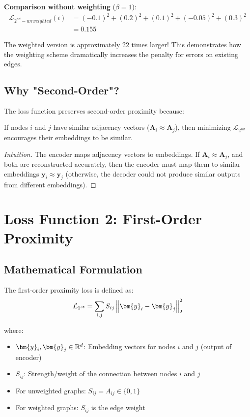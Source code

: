 \begin{notechapter}
\begin{example}
\textbf{Comparison without weighting} ($\beta = 1$):
\begin{align*}
\mathcal{L}_{2^{nd}-{unweighted}}(i) &= (-0.1)^2 + (0.2)^2 + (0.1)^2 + (-0.05)^2 + (0.3)^2 \\
&= 0.155
\end{align*}

The weighted version is approximately 22 times larger! This demonstrates how the weighting scheme dramatically increases the penalty for errors on existing edges.
\end{example}

\subsection{Why "Second-Order"?}

The loss function preserves second-order proximity because:

\begin{proposition}
If nodes $i$ and $j$ have similar adjacency vectors ($\bm{A}_i \approx \bm{A}_j$),
then minimizing $\mathcal{L}_{2^{nd}}$ encourages their embeddings to be similar.
\end{proposition}

\begin{proof}[Intuition]
The encoder maps adjacency vectors to embeddings. If $\bm{A}_i \approx \bm{A}_j$, and both are reconstructed accurately, then the encoder must map them to similar embeddings $\bm{y}_i \approx \bm{y}_j$ (otherwise, the decoder could not produce similar outputs from different embeddings).
\end{proof}

\section{Loss Function 2: First-Order Proximity}

\subsection{Mathematical Formulation}

The first-order proximity loss is defined as:
\begin{equation}
\mathcal{L}_{1^{st}} = \sum_{i,j} S_{ij} \norm{\bm{y}_i - \bm{y}_j}^2_2
\label{graph-autoencoders:eq:l1_loss}
\end{equation}

where:
\begin{itemize}
    \item $\bm{y}_i, \bm{y}_j \in \R^d$: Embedding vectors for nodes $i$ and $j$ (output of encoder)
    \item $S_{ij}$: Strength/weight of the connection between nodes $i$ and $j$
    \item For unweighted graphs: $S_{ij} = A_{ij} \in \{0, 1\}$
    \item For weighted graphs: $S_{ij}$ is the edge weight
\end{itemize}


\end{notechapter}
